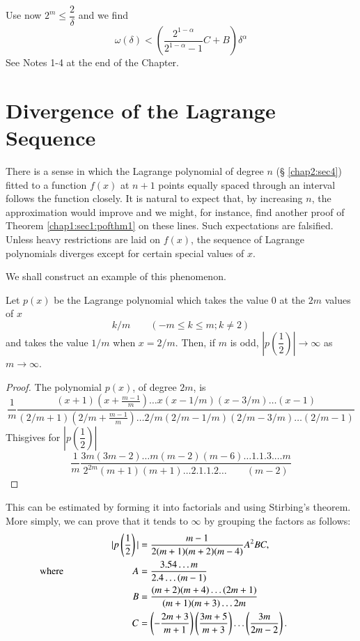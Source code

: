 Use now $2^m \leq \dfrac{2}{\delta}$ and we find
$$
\omega (\delta) < \left(\dfrac{2^{1-\alpha}}{2^{1-\alpha}-1} C+B
\right) \delta^{\alpha} 
$$
See Notes 1-4 at the end of the Chapter.

\section{Divergence of the Lagrange Sequence}\label{chap5:sec14}

There is a sense in which the Lagrange polynomial of degree $n$ (\S
\ref{chap2:sec4}) 
fitted to a function $f(x)$ at $n+1$ points equally spaced through an
interval follows the function closely. It is natural to expect that,
by increasing $n$, the approximation would improve and we might, for
instance, find another proof of Theorem \ref{chap1:sec1:pofthm1} on these lines. Such
expectations are falsified. Unless heavy restrictions are laid on
$f(x)$, the sequence of Lagrange polynomials diverges except for
certain special values of $x$.  

We shall construct an example of this phenomenon.

\begin{lemma*}
  Let $p(x)$ be the Lagrange polynomial which takes the value $0$ at
  the $2m$ values of $x$ 
  $$
  k/m \qquad (-m \leq k \leq m; k \neq 2)
  $$
  and takes the value $1/m$ when $x = 2/m$. Then, if $m$ is odd,
  $|p \left(\dfrac{1}{2}\right)| \to \infty$ as $m \to \infty$. 
\end{lemma*} 

\begin{proof}
  The polynomial $p(x)$, of degree $2m$, is 
  $$
  \frac{1}{m} \frac{(x+1) (x+ \frac{m-1}{m}) \ldots x (x-1/m) (x-3/m)
    \ldots (x-1)}{(2/m+1) (2/m + \frac{m-1}{m}) \ldots 2/m(2/m-1/m)
    (2/m-3/m) \ldots (2/m-1)} 
  $$
  This\pageoriginale gives for $|p\left(\dfrac{1}{2}\right)|$
  $$
  \frac{1}{m} \frac{3m(3m-2)\ldots m(m-2) (m-6) \ldots 1.1.3.\ldots
    m}{2^{2m} (m+1) (m+1) \ldots2. 1.1.2 \ldots \qquad (m-2)} 
  $$
\end{proof}

This can be estimated by forming it into factorials and using
Stirbing's theorem. More simply, we can prove that it tends to
$\infty$ by grouping the factors as follows: 
\begin{align*}
  |p\left(\frac{1}{2}\right)| & = \frac{m-1}{2(m+1) (m+2) (m-4)} A^2 B
  C,\hspace{2cm}\\ 
  ~\text{where} \hspace{2.5cm} A& = \frac{3.54 \ldots m}{2.4 \ldots (m-1)}\\
  B & = \frac{(m+2)(m+4) \ldots (2m +1)}{(m+1) (m+3) \ldots 2m}\\
  C& = \left(- \frac{2m+3}{m+1}\right) \left(\frac{3m+5}{m+3}\right)
  \ldots \left(\frac{3m}{2m-2}\right). 
\end{align*}

